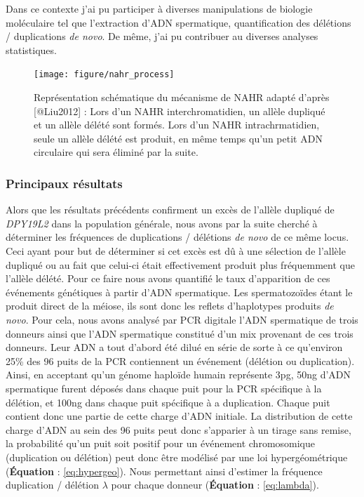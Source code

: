 \documentclass[12pt,twoside]{ugathesis}
\theoremstyle{definition}
\theoremstyle{definition}
\theoremstyle{remark}
\begin{document}
Dans ce contexte j'ai pu participer à diverses manipulations de biologie
moléculaire tel que l'extraction d'ADN spermatique, quantification des
délétions / duplications \emph{de novo}. De même, j'ai pu contribuer au
diverses analyses statistiques.

\newpage 

\begin{figure}

{\centering \texttt{[image: figure/nahr\_process]} 

}

\caption[Représentation schématique du mécanisme de NAHR]{Représentation schématique du mécanisme de NAHR adapté d'après [@Liu2012] : Lors d'un NAHR interchromatidien, un allèle dupliqué et un allèle délété sont formés. Lors d'un NAHR intrachrmatidien, seule un allèle délété est produit, en même temps qu'un petit ADN circulaire qui sera éliminé par la suite.}\label{fig:nahr}
\end{figure}

\newpage



\newpage

\subsubsection{Principaux résultats}\label{principaux-resultats}

Alors que les résultats précédents confirment un excès de l'allèle
dupliqué de \emph{DPY19L2} dans la population générale, nous avons par
la suite cherché à déterminer les fréquences de duplications / délétions
\emph{de novo} de ce même locus. Ceci ayant pour but de déterminer si
cet excès est dû à une sélection de l'allèle dupliqué ou au fait que
celui-ci était effectivement produit plus fréquemment que l'allèle
délété. Pour ce faire nous avons quantifié le taux d'apparition de ces
événements génétiques à partir d'ADN spermatique. Les spermatozoïdes
étant le produit direct de la méiose, ils sont donc les reflets
d'haplotypes produits \emph{de novo}. Pour cela, nous avons analysé par
PCR digitale l'ADN spermatique de trois donneurs ainsi que l'ADN
spermatique constitué d'un mix provenant de ces trois donneurs. Leur ADN
a tout d'abord été dilué en série de sorte à ce qu'environ 25\% des 96
puits de la PCR contiennent un événement (délétion ou duplication).
Ainsi, en acceptant qu'un génome haploïde humain représente 3pg, 50ng
d'ADN spermatique furent déposés dans chaque puit pour la PCR spécifique
à la délétion, et 100ng dans chaque puit spécifique à a duplication.
Chaque puit contient donc une partie de cette charge d'ADN initiale. La
distribution de cette charge d'ADN au sein des 96 puits peut donc
s'apparier à un tirage sans remise, la probabilité qu'un puit soit
positif pour un événement chromosomique (duplication ou délétion) peut
donc être modélisé par une loi hypergéométrique (\textbf{Équation} :
\eqref{eq:hypergeo}). Nous permettant ainsi d'estimer la fréquence
duplication / délétion \(\lambda\) pour chaque donneur
(\textbf{Équation} : \eqref{eq:lambda}).
\end{document}

